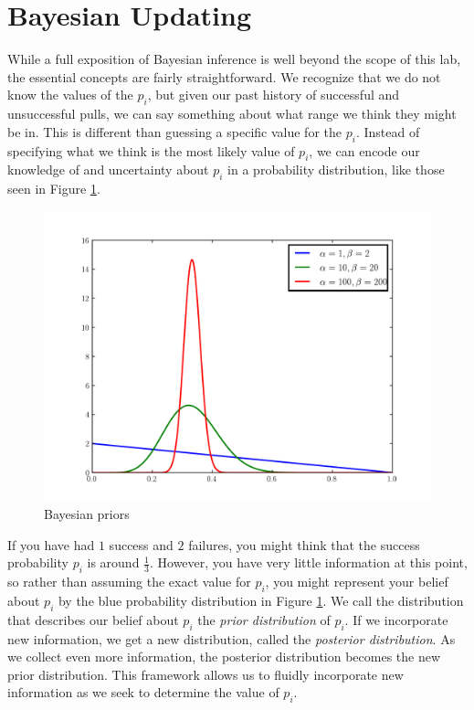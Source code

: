 \section*{Bayesian Updating}
While a full exposition of Bayesian inference is well beyond the
scope of this lab, the essential concepts are fairly straightforward.
We recognize that we do not know the values of the $p_i$,
but given our past history of successful and unsuccessful
pulls, we can say something about what range we think they might be in.
This is different than guessing a specific value for the $p_i$.
Instead of specifying what we think is the most likely value of $p_i$,
we can encode our knowledge of and uncertainty about $p_i$ in a
probability distribution,
like those seen in Figure \ref{fig:priors}.
\begin{figure}

\centering
\includegraphics[width=\textwidth]{priors.pdf}
\caption{Bayesian priors}
\label{fig:priors}
\end{figure}

If you have had $1$ success and $2$ failures, you might
think that the success probability
$p_i$ is around $\frac{1}{3}$.
However, you have very little information at this point,
so rather than assuming the exact value for $p_i$,
you might represent your belief about $p_i$
by the blue probability distribution in Figure \ref{fig:priors}.
We call the distribution that describes our belief about $p_i$
the \emph{prior distribution} of $p_i$.  If we incorporate new information,
we get a new distribution, called the \emph{posterior distribution}.
As we collect even more information, the posterior distribution becomes
the new prior distribution. This framework allows us to fluidly incorporate
new information as we seek to determine the value of $p_i$.


